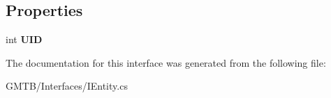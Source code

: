 \subsection*{Properties}
\begin{DoxyCompactItemize}
\item 
\mbox{\label{interface_g_m_t_b_1_1_interfaces_1_1_i_entity_a41bff01fc162666cfd9ccd77161a1e5e}} 
int {\bfseries U\+ID}
\end{DoxyCompactItemize}


The documentation for this interface was generated from the following file\+:\begin{DoxyCompactItemize}
\item 
G\+M\+T\+B/\+Interfaces/I\+Entity.\+cs\end{DoxyCompactItemize}
